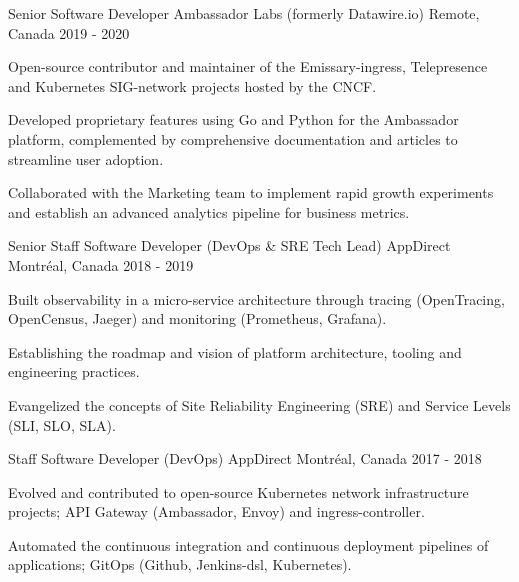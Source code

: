 \begin{cventries}
  \cventry
    {Senior Software Developer} %
    {Ambassador Labs (formerly Datawire.io)} %
    {Remote, Canada} %
    {2019 - 2020} %
    {
      \begin{cvitems} %
        \item {Open-source contributor and maintainer of the Emissary-ingress, Telepresence and Kubernetes SIG-network projects hosted by the CNCF.}
        \item {Developed proprietary features using Go and Python for the Ambassador platform, complemented by comprehensive documentation and articles to streamline user adoption.}
        \item {Collaborated with the Marketing team to implement rapid growth experiments and establish an advanced analytics pipeline for business metrics.}
      \end{cvitems}
    }

  \cventry
    {Senior Staff Software Developer (DevOps \& SRE Tech Lead)} %
    {AppDirect} %
    {Montréal, Canada} %
    {2018 - 2019} %
    {
      \begin{cvitems} %
        \item {Built observability in a micro-service architecture through tracing (OpenTracing, OpenCensus, Jaeger) and monitoring (Prometheus, Grafana).}
        \item {Establishing the roadmap and vision of platform architecture, tooling and engineering practices.}
        \item {Evangelized the concepts of Site Reliability Engineering (SRE) and Service Levels (SLI, SLO, SLA).}
      \end{cvitems}
    }

  \cventry
    {Staff Software Developer (DevOps)} %
    {AppDirect} %
    {Montréal, Canada} %
    {2017 - 2018} %
    {
      \begin{cvitems} %
        \item {Evolved and contributed to open-source Kubernetes network infrastructure projects; API Gateway (Ambassador, Envoy) and ingress-controller.}
        \item {Automated the continuous integration and continuous deployment pipelines of applications; GitOps (Github, Jenkins-dsl, Kubernetes).}
      \end{cvitems}
    }


\end{cventries}
